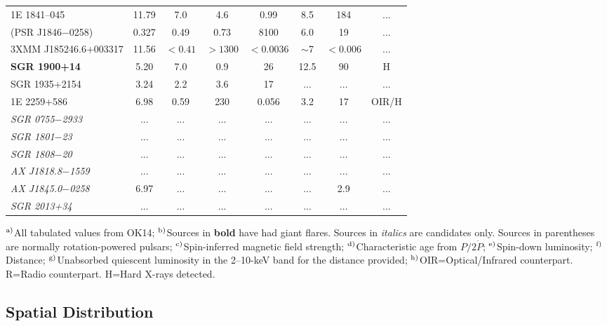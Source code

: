 \begin{table}
\begin{center}
\begin{tabular}{@{}l|c|c|c|c|c|c|c@{}}
1E 1841--045 & 11.79 & 7.0 & 4.6 & 0.99& 8.5 & 184 & ...  \\
(PSR J1846$-$0258) & 0.327 & 0.49 & 0.73 & 8100 & 6.0 & 19 & ... \\
3XMM J185246.6+003317 & 11.56 & $<0.41$ & $>1300$ & $<0.0036$& $\sim$7 & $<0.006$ & ... \\
{\bf SGR 1900+14} & 5.20 & 7.0 & 0.9 & 26& 12.5 & 90 & H \\
SGR 1935+2154 & 3.24 & 2.2 & 3.6 & 17 & ... & ... & ...\\
1E 2259+586 & 6.98 & 0.59 & 230 & 0.056 & 3.2 & 17 &  OIR/H\\
{\it SGR 0755$-$2933} & ... & ... & ...& ... & ... & ... & ... \\
{\it SGR 1801$-$23}   & ... & ... & ... & ... & ... & ... & ...\\
{\it SGR 1808$-$20}    & ... & ... & ... & ... & ... & ... & ...\\
{\it AX J1818.8$-$1559}     & ... & ... & ... & ... & ... & ... & ...\\
{\it AX J1845.0$-$0258} & 6.97 & ... & ... & ...& ... & 2.9 &  ... \\
{\it SGR 2013+34 } & ... & ... & ... & ... & ... & ... & ...\\
\hline
\end{tabular}
\end{center}
\begin{tabnote}
$^{\rm a)}$All tabulated values from OK14;
$^{\rm b)}$Sources in {\bf bold} have had giant flares. Sources in {\it italics} are candidates only. Sources in parentheses are
normally rotation-powered pulsars;
$^{\rm c)}$Spin-inferred magnetic field strength; 
$^{\rm d)}$Characteristic age from $P/2\dot{P}$; 
$^{\rm e)}$Spin-down luminosity;
$^{\rm f)}$Distance; 
$^{\rm g)}$Unabsorbed quiescent luminosity in the 2--10-keV band for the distance provided; 
$^{\rm h)}$OIR=Optical/Infrared counterpart. R=Radio counterpart. H=Hard X-rays detected.
\end{tabnote}
\label{ta:srcs}
\end{table}



\subsection{Spatial Distribution}
\label{sec:spatial}

